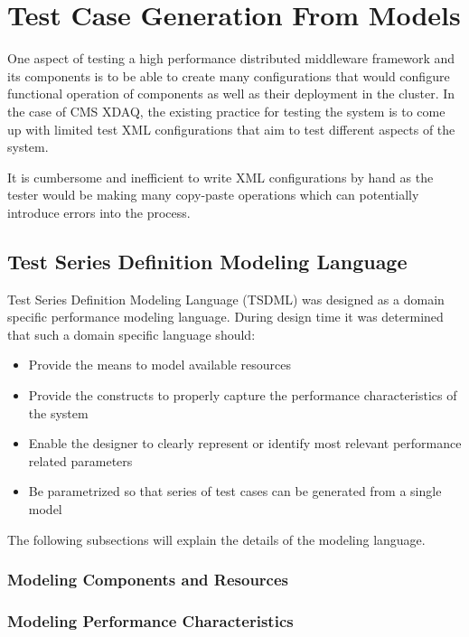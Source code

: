 \chapter{Test Case Generation From Models}

One aspect of testing a high performance distributed middleware framework and its components is to be able to create many configurations that would configure functional operation of components as well as their deployment in the cluster. In the case of CMS XDAQ, the existing practice for testing the system is to come up with limited test XML configurations that aim to test different aspects of the system. 

It is cumbersome and inefficient to write XML configurations by hand as the tester would be making many copy-paste operations which can potentially introduce errors into the process.

\section{Test Series Definition Modeling Language}
Test Series Definition Modeling Language (TSDML) was designed as a domain specific performance modeling language. During design time it was determined that such a domain specific language should:

\begin{itemize}
	\item Provide the means to model available resources
	\item Provide the constructs to properly capture the performance characteristics of the system
	\item Enable the designer to clearly represent or identify most relevant performance related parameters
	\item Be parametrized so that series of test cases can be generated from a single model
\end{itemize}

The following subsections will explain the details of the modeling language.

\subsection{Modeling Components and Resources}


\subsection{Modeling Performance Characteristics}

